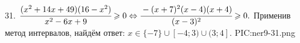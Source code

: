 31. $\cfrac{(x^2+14x+49)(16-x^2)}{x^2-6x+9}\geqslant0\Leftrightarrow\cfrac{-(x+7)^2(x-4)(x+4)}{(x-3)^2}\geqslant0.$ Применив метод интервалов, найдём ответ: $x\in
\{-7\}\cup[-4;3)\cup(3;4].$
{{PIC:ner9-31.png}}\\
